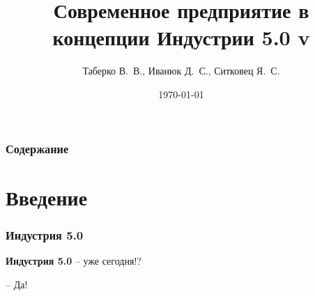 \documentclass{beamer}
\title{
    Современное предприятие в концепции Индустрии 5.0
    \ifdefined\tagversion
        \newline
        \newline
        v\tagversion
    \fi}
\author{Таберко В.~В., Иванюк Д.~С., Ситковец Я.~С.}
\institute{Савушкин продукт}
\date{\today}
\begin{document}
\frame{\titlepage}

\begin{frame}
    \frametitle{Содержание}
    \tableofcontents
\end{frame}

\section{Введение}
 {
  \begin{frame}
      \frametitle{Индустрия 5.0}

      {\Large \textbf{Индустрия 5.0}} -- уже сегодня!?

      -- Да!
  \end{frame}
 }
\end{document}
